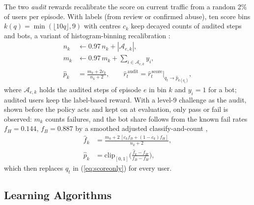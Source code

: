 \documentclass{ieeetj}
\begin{document}
The two \emph{audit} rewards recalibrate the score on current traffic from a random 2\% of users per episode. With labels (from review or confirmed abuse), ten score bins $k(q)=\min(\lfloor10q\rfloor,9)$ with centres $c_k$ keep decayed counts of audited steps and bots, a variant of histogram-binning recalibration \cite{zadrozny_2001}:
\begin{equation}
\begin{aligned}
n_k&\leftarrow0.97\,n_k+|\mathcal A_{e,k}|,\\
m_k&\leftarrow0.97\,m_k+\textstyle\sum_{i\in\mathcal A_{e,k}}y_i,\\
\hat p_k&=\frac{m_k+2c_k}{n_k+2},\qquad \hat r^{\,\text{audit}}_t=\hat r^{\,\text{score}}_t\big|_{q_t\to\hat p_{k(q_t)}},
\end{aligned}
\label{eq:recal}
\end{equation}
where $\mathcal A_{e,k}$ holds the audited steps of episode $e$ in bin $k$ and $y_i=1$ for a bot; audited users keep the label-based reward. With a level-9 challenge as the audit, shown before the policy acts and kept on at evaluation, only pass or fail is observed: $m_k$ counts failures, and the bot share follows from the known fail rates $f_H=0.144$, $f_B=0.887$ by a smoothed adjusted classify-and-count \cite{forman_2008},
\begin{equation}
\begin{aligned}
\hat f_k&=\frac{m_k+2\,[c_kf_B+(1-c_k)f_H]}{n_k+2},\\
\hat p_k&=\mathrm{clip}_{[0,1]}\Big(\frac{\hat f_k-f_H}{f_B-f_H}\Big),
\end{aligned}
\label{eq:recal_ch}
\end{equation}
which then replaces $q_t$ in (\ref{eq:scoreonly}) for every user.

\vspace{-5pt}
\subsection{Learning Algorithms}
\label{sec:algos}
\end{document}
